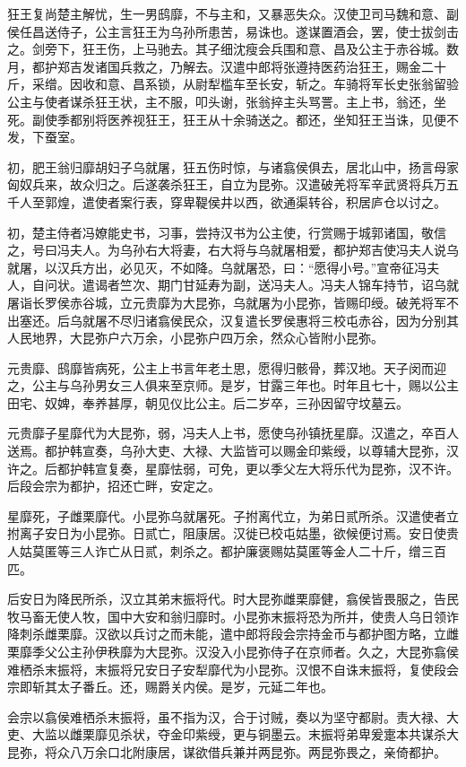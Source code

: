 \documentclass[]{article}
\begin{document}
狂王复尚楚主解忧，生一男鸱靡，不与主和，又暴恶失众。汉使卫司马魏和意、副侯任昌送侍子，公主言狂王为乌孙所患苦，易诛也。遂谋置酒会，罢，使士拔剑击之。剑旁下，狂王伤，上马驰去。其子细沈瘦会兵围和意、昌及公主于赤谷城。数月，都护郑吉发诸国兵救之，乃解去。汉遣中郎将张遵持医药治狂王，赐金二十斤，采缯。因收和意、昌系锁，从尉犁槛车至长安，斩之。车骑将军长史张翁留验公主与使者谋杀狂王状，主不服，叩头谢，张翁捽主头骂詈。主上书，翁还，坐死。副使季都别将医养视狂王，狂王从十余骑送之。都还，坐知狂王当诛，见便不发，下蚕室。

初，肥王翁归靡胡妇子乌就屠，狂五伤时惊，与诸翕侯俱去，居北山中，扬言母家匈奴兵来，故众归之。后遂袭杀狂王，自立为昆弥。汉遣破羌将军辛武贤将兵万五千人至郭煌，遣使者案行表，穿卑鞮侯井以西，欲通渠转谷，积居庐仓以讨之。

初，楚主侍者冯嫽能史书，习事，尝持汉书为公主使，行赏赐于城郭诸国，敬信之，号曰冯夫人。为乌孙右大将妻，右大将与乌就屠相爱，都护郑吉使冯夫人说乌就屠，以汉兵方出，必见灭，不如降。乌就屠恐，曰：``愿得小号。''宣帝征冯夫人，自问状。遣谒者竺次、期门甘延寿为副，送冯夫人。冯夫人锦车持节，诏乌就屠诣长罗侯赤谷城，立元贵靡为大昆弥，乌就屠为小昆弥，皆赐印绶。破羌将军不出塞还。后乌就屠不尽归诸翕侯民众，汉复遣长罗侯惠将三校屯赤谷，因为分别其人民地界，大昆弥户六万余，小昆弥户四万余，然众心皆附小昆弥。

元贵靡、鸱靡皆病死，公主上书言年老土思，愿得归骸骨，葬汉地。天子闵而迎之，公主与乌孙男女三人俱来至京师。是岁，甘露三年也。时年且七十，赐以公主田宅、奴婢，奉养甚厚，朝见仪比公主。后二岁卒，三孙因留守坟墓云。

元贵靡子星靡代为大昆弥，弱，冯夫人上书，愿使乌孙镇抚星靡。汉遣之，卒百人送焉。都护韩宣奏，乌孙大吏、大禄、大监皆可以赐金印紫绶，以尊辅大昆弥，汉许之。后都护韩宣复奏，星靡怯弱，可免，更以季父左大将乐代为昆弥，汉不许。后段会宗为都护，招还亡畔，安定之。

星靡死，子雌栗靡代。小昆弥乌就屠死。子拊离代立，为弟日贰所杀。汉遣使者立拊离子安日为小昆弥。日贰亡，阻康居。汉徙已校屯姑墨，欲候便讨焉。安日使贵人姑莫匿等三人诈亡从日贰，刺杀之。都护廉褒赐姑莫匿等金人二十斤，缯三百匹。

后安日为降民所杀，汉立其弟末振将代。时大昆弥雌栗靡健，翕侯皆畏服之，告民牧马畜无使人牧，国中大安和翁归靡时。小昆弥末振将恐为所并，使贵人乌日领诈降刺杀雌栗靡。汉欲以兵讨之而未能，遣中郎将段会宗持金币与都护图方略，立雌栗靡季父公主孙伊秩靡为大昆弥。汉没入小昆弥侍子在京师者。久之，大昆弥翕侯难栖杀末振将，末振将兄安日子安犁靡代为小昆弥。汉恨不自诛末振将，复使段会宗即斩其太子番丘。还，赐爵关内侯。是岁，元延二年也。

会宗以翕侯难栖杀末振将，虽不指为汉，合于讨贼，奏以为坚守都尉。责大禄、大吏、大监以雌栗靡见杀状，夺金印紫绶，更与铜墨云。末振将弟卑爰疐本共谋杀大昆弥，将众八万余口北附康居，谋欲借兵兼并两昆弥。两昆弥畏之，亲倚都护。
\end{document}

